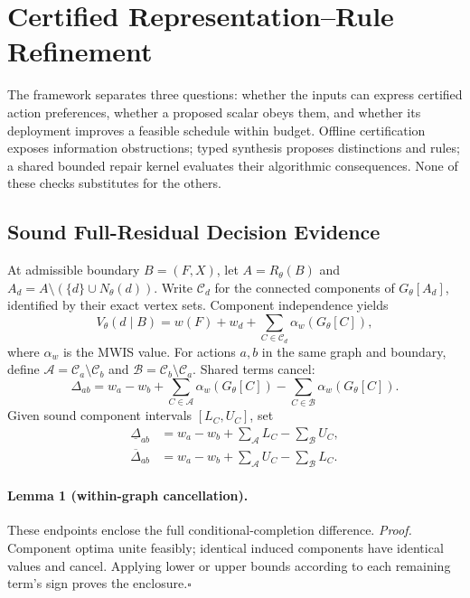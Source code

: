 \section{Certified Representation--Rule Refinement}
\label{sec:method}

The framework separates three questions: whether the inputs can express
certified action preferences, whether a proposed scalar obeys them, and
whether its deployment improves a feasible schedule within budget. Offline
certification exposes information obstructions; typed synthesis proposes
distinctions and rules; a shared bounded repair kernel evaluates their
algorithmic consequences. None of these checks substitutes for the others.

\subsection{Sound Full-Residual Decision Evidence}
\label{sec:method:certificates}
At admissible boundary $B=(F,X)$, let $A=R_\theta(B)$ and
$A_d=A\setminus(\{d\}\cup N_\theta(d))$. Write $\mathcal C_d$ for
the connected components of $G_\theta[A_d]$, identified by their exact
vertex sets. Component independence yields
\begin{equation}
 V_\theta(d\mid B)=w(F)+w_d+\sum_{C\in\mathcal C_d}\alpha_w(G_\theta[C]),
 \label{eq:component-completion}
\end{equation}
where $\alpha_w$ is the MWIS value. For actions $a,b$ in the same graph
and boundary, define $\mathcal A=\mathcal C_a\setminus\mathcal C_b$
and $\mathcal B=\mathcal C_b\setminus\mathcal C_a$. Shared terms cancel:
\begin{equation}
 \Delta_{ab}=w_a-w_b+\sum_{C\in\mathcal A}\alpha_w(G_\theta[C])
                         -\sum_{C\in\mathcal B}\alpha_w(G_\theta[C]).
 \label{eq:cancelled-difference}
\end{equation}
Given sound component intervals $[L_C,U_C]$, set
\begin{equation}
 \begin{split}
 \underline\Delta_{ab}&=w_a-w_b+\sum_{\mathcal A}L_C-\sum_{\mathcal B}U_C,\\
 \overline\Delta_{ab}&=w_a-w_b+\sum_{\mathcal A}U_C-\sum_{\mathcal B}L_C.
 \end{split}
 \label{eq:difference-envelope}
\end{equation}
\paragraph{Lemma 1 (within-graph cancellation).}
These endpoints enclose the full conditional-completion difference.
\emph{Proof.} Component optima unite feasibly; identical induced components
have identical values and cancel. Applying lower or upper bounds according
to each remaining term's sign proves the enclosure.\hfill$\square$

